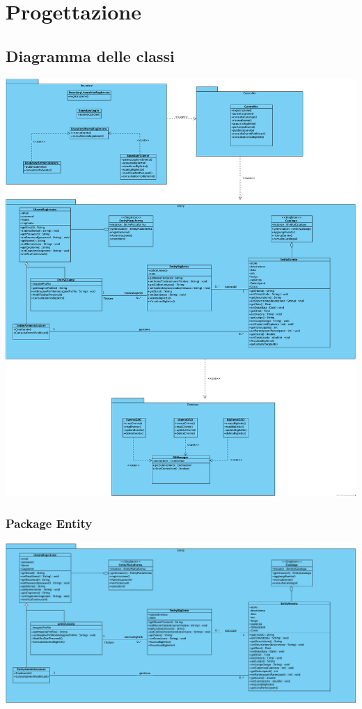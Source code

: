 \chapter{Progettazione}
\section{Diagramma delle classi }
\begin{center}	
	\vspace{1ex}
	\includegraphics[height=0.9\linewidth]{assets/package/Diagrammadelleclassi.png}
	\vspace{1ex}
\end{center}
\subsection{Package Entity}
\begin{center}	
	\vspace{1ex}
	\includegraphics[height=0.38\linewidth]{assets/package/entity.png}
	\vspace{1ex}
\end{center}
